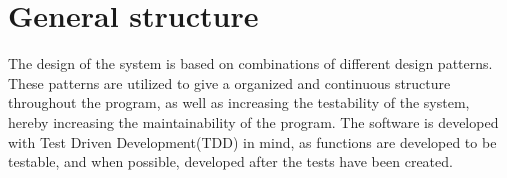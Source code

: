 \section{General structure}
The design of the system is based on combinations of different design patterns. These patterns are utilized to give a organized and continuous structure throughout the program, as well as increasing the testability of the system, hereby increasing the maintainability of the program. 
The software is developed with Test Driven Development(TDD) in mind, as functions are developed to be testable, and when possible, developed after the tests have been created. \\ 
